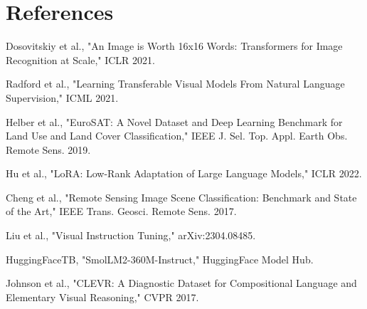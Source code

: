\documentclass{article}
\begin{document}
\section{References}
\begin{enumerate}[label={[\arabic*]}]
    \item Dosovitskiy et al., "An Image is Worth 16x16 Words: Transformers for Image Recognition at Scale," ICLR 2021.
    \item Radford et al., "Learning Transferable Visual Models From Natural Language Supervision," ICML 2021.
    \item Helber et al., "EuroSAT: A Novel Dataset and Deep Learning Benchmark for Land Use and Land Cover Classification," IEEE J. Sel. Top. Appl. Earth Obs. Remote Sens. 2019.
    \item Hu et al., "LoRA: Low-Rank Adaptation of Large Language Models," ICLR 2022.
    \item Cheng et al., "Remote Sensing Image Scene Classification: Benchmark and State of the Art," IEEE Trans. Geosci. Remote Sens. 2017.
    \item Liu et al., "Visual Instruction Tuning," arXiv:2304.08485.
    \item HuggingFaceTB, "SmolLM2-360M-Instruct," HuggingFace Model Hub.
    \item Johnson et al., "CLEVR: A Diagnostic Dataset for Compositional Language and Elementary Visual Reasoning," CVPR 2017.
\end{enumerate}
\end{document}
